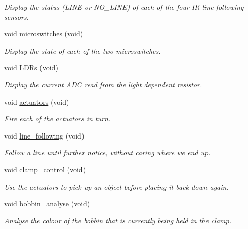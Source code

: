 \begin{DoxyCompactItemize}
\begin{DoxyCompactList}\small\item\em Display the status (LINE or NO\_\-LINE) of each of the four IR line following sensors. \item\end{DoxyCompactList}\item 
void \hyperlink{classIDP_1_1SelfTests_a6b2e4d0517de4b73c63f1b1a475b602f}{microswitches} (void)
\begin{DoxyCompactList}\small\item\em Display the state of each of the two microswitches. \item\end{DoxyCompactList}\item 
void \hyperlink{classIDP_1_1SelfTests_a56952650637691f869ef21f7d43f1226}{LDRs} (void)
\begin{DoxyCompactList}\small\item\em Display the current ADC read from the light dependent resistor. \item\end{DoxyCompactList}\item 
void \hyperlink{classIDP_1_1SelfTests_a0ca765ac144fafaab502f4326a480486}{actuators} (void)
\begin{DoxyCompactList}\small\item\em Fire each of the actuators in turn. \item\end{DoxyCompactList}\item 
void \hyperlink{classIDP_1_1SelfTests_a0a1a40b56fee5249def567bebdb05dc1}{line\_\-following} (void)
\begin{DoxyCompactList}\small\item\em Follow a line until further notice, without caring where we end up. \item\end{DoxyCompactList}\item 
void \hyperlink{classIDP_1_1SelfTests_a896204355ca039660a12e8131578b6c3}{clamp\_\-control} (void)
\begin{DoxyCompactList}\small\item\em Use the actuators to pick up an object before placing it back down again. \item\end{DoxyCompactList}\item 
void \hyperlink{classIDP_1_1SelfTests_a66f0a3bad277e36b963b2bf3cd5df9dd}{bobbin\_\-analyse} (void)
\begin{DoxyCompactList}\small\item\em Analyse the colour of the bobbin that is currently being held in the clamp. \item\end{DoxyCompactList}\item 

\end{DoxyCompactItemize}
